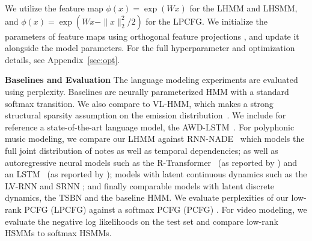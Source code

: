 \documentclass{article}
\begin{document}
We utilize the feature map $\phi(x) = \exp(Wx)$ for the LHMM and LHSMM, and $\phi(x) = \exp(Wx - \|x\|_2^2/2)$ for the LPCFG. We initialize the parameters of feature maps using orthogonal feature projections \citep{choromanski2020performer}, and update it alongside the model parameters.
For the full hyperparameter and optimization details, see Appendix~\ref{sec:opt}.

\textbf{Baselines and Evaluation}
The language modeling experiments are evaluated using perplexity. Baselines are neurally parameterized HMM
with a standard softmax transition.  We also compare to VL-HMM, which makes a strong structural sparsity assumption on the emission distribution~\citep{chiu2020scaling}. We include for reference a state-of-the-art language model, the AWD-LSTM~\citep{merity2017awdlstm}. For polyphonic music modeling, we compare our LHMM against RNN-NADE~\citep{polyphonic} which models the full joint distribution of notes as well as temporal dependencies; as well as autoregressive neural models such as the R-Transformer~\citep{rtransformer} (as reported by \citet{betalstm}) and an LSTM ~(as reported by \citet{flow}); models with latent continuous dynamics such as the LV-RNN \citep{nasmc} and SRNN \citep{srnn}; and finally comparable models with latent discrete dynamics, the TSBN \citep{tsbn} and the baseline HMM.
We evaluate perplexities of our low-rank PCFG (LPCFG) against a softmax PCFG (PCFG) \citep{kim2019cpcfg}. For video modeling, we evaluate the negative log likelihoods on the test set and compare low-rank HSMMs to softmax HSMMs.
\end{document}

